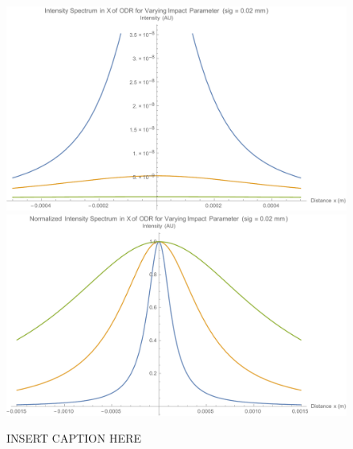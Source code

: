 \documentclass[12pt]{article}
\begin{document}
\begin{figure}
\begin{center}
\includegraphics[scale=0.5]{figures/ODR_IntensityX_IP.PDF}
\includegraphics[scale=0.5]{figures/ODR_Norm_IntensityX_IP.PDF}
\caption{INSERT CAPTION HERE}
\end{center}
\end{figure}
\end{document}
